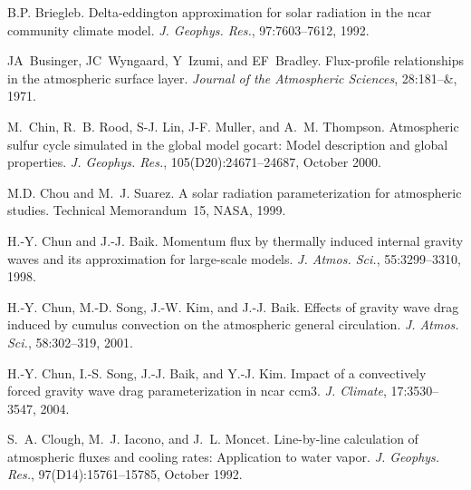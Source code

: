 \begin{DoxyDescription}
\item[\label{_CITEREF_briegleb_1992}%
\mbox{[}8\mbox{]}]B.\+P. Briegleb. Delta-\/eddington approximation for solar radiation in the ncar community climate model. {\itshape J. Geophys. Res.}, 97\+:7603--7612, 1992.


\item[\label{_CITEREF_businger_et_al_1971}%
\mbox{[}9\mbox{]}]JA~Businger, JC~Wyngaard, Y~Izumi, and EF~Bradley. Flux-\/profile relationships in the atmospheric surface layer. {\itshape Journal of the Atmospheric Sciences}, 28\+:181--\&, 1971.


\item[\label{_CITEREF_chin_et_al_2000}%
\mbox{[}10\mbox{]}]M.~Chin, R.~B. Rood, S-\/J. Lin, J-\/F. Muller, and A.~M. Thompson. Atmospheric sulfur cycle simulated in the global model gocart\+: Model description and global properties. {\itshape J. Geophys. Res.}, 105(D20)\+:24671--24687, October 2000.


\item[\label{_CITEREF_chou_and_suarez_1999}%
\mbox{[}11\mbox{]}]M.\+D. Chou and M.~J. Suarez. A solar radiation parameterization for atmospheric studies. Technical Memorandum~15, N\+A\+SA, 1999.


\item[\label{_CITEREF_chun_and_baik_1998}%
\mbox{[}12\mbox{]}]H.-\/Y. Chun and J.-\/J. Baik. Momentum flux by thermally induced internal gravity waves and its approximation for large-\/scale models. {\itshape J. Atmos. Sci.}, 55\+:3299--3310, 1998.


\item[\label{_CITEREF_chun_et_al_2001}%
\mbox{[}13\mbox{]}]H.-\/Y. Chun, M.-\/D. Song, J.-\/W. Kim, and J.-\/J. Baik. Effects of gravity wave drag induced by cumulus convection on the atmospheric general circulation. {\itshape J. Atmos. Sci.}, 58\+:302--319, 2001.


\item[\label{_CITEREF_chun_et_al_2004}%
\mbox{[}14\mbox{]}]H.-\/Y. Chun, I.-\/S. Song, J.-\/J. Baik, and Y.-\/J. Kim. Impact of a convectively forced gravity wave drag parameterization in ncar ccm3. {\itshape J. Climate}, 17\+:3530--3547, 2004.


\item[\label{_CITEREF_clough_et_al_1992}%
\mbox{[}15\mbox{]}]S.~A. Clough, M.~J. Iacono, and J.~L. Moncet. Line-\/by-\/line calculation of atmospheric fluxes and cooling rates\+: Application to water vapor. {\itshape J. Geophys. Res.}, 97(D14)\+:15761--15785, October 1992.



\end{DoxyDescription}
